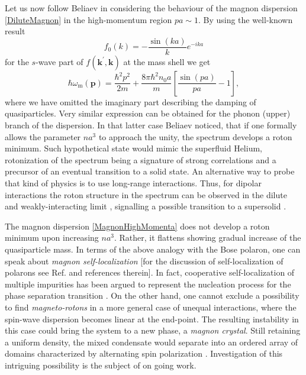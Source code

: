 \documentclass[reprint,superscriptaddress,showpacs,nofootinbib,aps,pra]{revtex4-1}
\begin{document}
Let us now follow Beliaev \cite{Beliaev} in considering the behaviour of the magnon dispersion \eqref{DiluteMagnon} in the high-momentum region $pa\sim 1$. By using the well-known result 
\begin{equation}
\label{f3Dk}
f_0(k)=-\frac{\sin (k a)}{k} e^{-i k a}
\end{equation} 
for the $s$-wave part of $f(\bm k^\prime,\bm k)$ at the mass shell we get
\begin{equation}
\label{MagnonHighMomenta}
\hbar\omega_\mathrm{m}(\bm p)=\frac{\hbar^2 p^2}{2m}+\frac{8\pi\hbar^2 n_0 a}{m}\left[\frac{\sin (pa)}{pa} -1\right],
\end{equation}
where we have omitted the imaginary part describing the damping of quasiparticles. Very similar expression can be obtained for the phonon (upper) branch of the dispersion. In that latter case Beliaev noticed, that if one formally allows the parameter $na^3$ to approach the unity, the spectrum develops a roton minimum. Such hypothetical state would mimic the superfluid Helium, rotonization of the spectrum being a signature of strong correlations and a precursor of an eventual transition to a solid state. An alternative way to probe that kind of physics is to use long-range interactions. Thus, for dipolar interactions the roton structure in the spectrum can be observed in the dilute and weakly-interacting limit \cite{Rotons}, signalling a possible transition to a supersolid \cite{FragmentedSS}.

The magnon dispersion \eqref{MagnonHighMomenta} does not develop a roton minimum upon increasing $na^3$. Rather, it flattens showing gradual increase of the quasiparticle mass. In terms of the above analogy with the Bose polaron, one can speak about \textit{magnon self-localization} [for the discussion of self-localization of polarons see Ref. \cite{Luis} and references therein]. In fact, cooperative self-localization of multiple impurities has been argued to represent the nucleation process for the phase separation transition \cite{Santamore}. On the other hand, one cannot exclude a possibility to find \textit{magneto-rotons} \cite{SpinRotons} in a more general case of unequal interactions, where the spin-wave dispersion becomes linear at the end-point. The resulting instability in this case could bring the system to a new phase, a \textit{magnon crystal}. Still retaining a uniform density, the mixed condensate would separate into an ordered array of domains characterized by alternating spin polarization \cite{MagnonCondensate}. Investigation of this intriguing possibility is the subject of on going work.  
\end{document}
